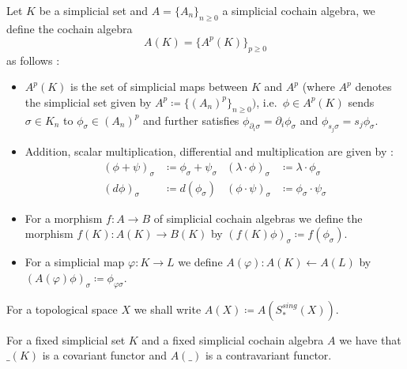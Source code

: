  \begin{Definition}
  Let $K$ be a simplicial set and $A = { \lbrace A_n \rbrace}_{n \geq 0}$ a simplicial cochain algebra, we define the cochain algebra
  $$ A(K) = { \lbrace A^p(K) \rbrace}_{ p \geq 0} $$
  as follows :
  \begin{itemize}
   \item $A^p(K)$ is the set of simplicial maps between $K$ and $A^p$ 
   (where $A^p$ denotes the simplicial set given by $A^p \coloneqq {\lbrace (A_n)^p \rbrace}_{n \geq 0})$, i.e.\ 
   $\phi \in A^p(K)$ sends $\sigma \in K_n$ to $\phi_{\sigma} \in {(A_n)}^p$ and further satisfies 
   $\phi_{ \partial_i \sigma} = \partial_i \phi_{\sigma}$ and $\phi_{ s_j \sigma} = s_j \phi_{\sigma}$.
   
   \item Addition, scalar multiplication, differential and multiplication are given by :
   \begin{align*}
    (\phi + \psi)_{\sigma} &\coloneqq \phi_{\sigma} + \psi_{\sigma} & 
    (\lambda \cdot \phi)_{\sigma} &\coloneqq \lambda \cdot \phi_{\sigma} \\
    (d \phi)_{\sigma} &\coloneqq d( \phi_{\sigma}) &  
    {(\phi \cdot \psi)}_{\sigma} &\coloneqq \phi_{\sigma}  \cdot \psi_{\sigma}
   \end{align*}
  
    \item For a morphism $f \colon A \to B$ \; of simplicial cochain algebras we define the morphism
      ${f(K) \colon A(K) \to B(K)}$ by $(f(K) \phi)_{\sigma} \coloneqq f(\phi_{\sigma})$.
    
    \item For a simplicial map $\varphi \colon K \to L$ we define ${A(\varphi) \colon A(K) \gets A(L)}$
      by $(A(\varphi) \phi)_{\sigma} \coloneqq \phi_{\varphi \sigma}$.
  \end{itemize}
  For a topological space $X$ we shall write $A(X) \coloneqq A(S_*^{sing}(X))$.
 \end{Definition}

 \begin{Remark}
  For a fixed simplicial set $K$ and a fixed simplicial cochain algebra $A$ we have that $\_(K)$ is a covariant functor and
  $A(\_)$ is a contravariant functor.
 \end{Remark}

 
